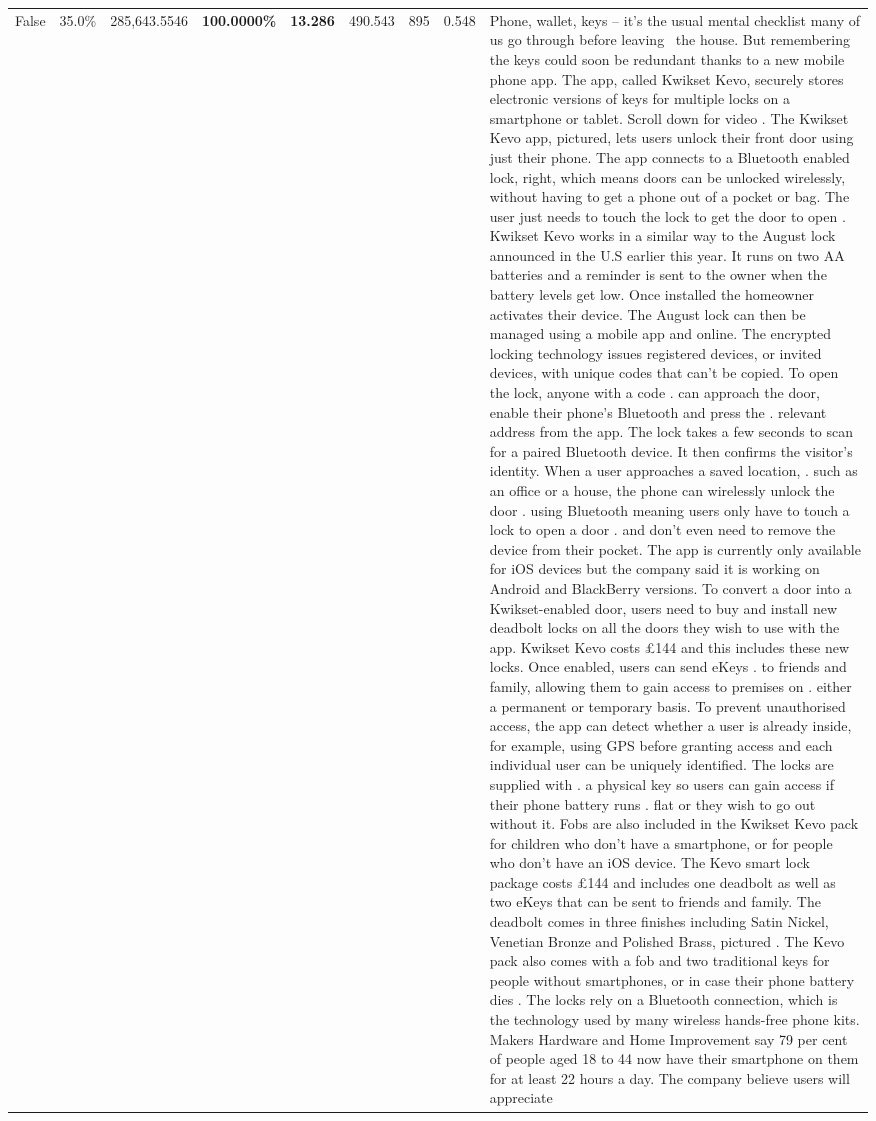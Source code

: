 \begin{table}[H]
\begin{tabular}{lllrlllll}
False & 35.0\% & \color{red} 285,643.5546 & \bfseries \color{red} 100.0000\% & \bfseries \color{red} 13.286 & 490.543 & 895 & 0.548 & Phone, wallet, keys – it’s the usual mental checklist many of us go through before leaving  the house. But remembering the keys could soon be redundant thanks to a new mobile phone app. The app, called Kwikset Kevo, securely stores electronic versions of keys for multiple locks on a smartphone or tablet. Scroll down for video . The Kwikset Kevo app, pictured, lets users unlock their front door using just their phone. The app connects to a Bluetooth enabled lock, right, which means doors can be unlocked wirelessly, without having to get a phone out of a pocket or bag. The user just needs to touch the lock to get the door to open . Kwikset Kevo works in a similar way to the August lock announced in the U.S earlier this year. It runs on two AA batteries and a reminder is sent to the owner when the battery levels get low. Once installed the homeowner activates their device. The August lock can then be managed using a mobile app and online. The encrypted locking technology issues registered devices, or invited devices, with unique codes that can't be copied. To open the lock, anyone with a code . can approach the door, enable their phone's Bluetooth and press the . relevant address from the app. The lock takes a few seconds to scan for a paired Bluetooth device. It then confirms the visitor's identity. When a user approaches a saved location, . such as an office or a house, the phone can wirelessly unlock the door . using Bluetooth meaning users only have to touch a lock to open a door . and don't even need to remove the device from their pocket. The app is currently only available for iOS devices but the company said it is working on Android and BlackBerry versions. To convert a door into a Kwikset-enabled door, users need to buy and install new deadbolt locks on all the doors they wish to use with the app. Kwikset Kevo costs £144 and this includes these new locks. Once enabled, users can send eKeys . to friends and family, allowing them to gain access to premises on . either a permanent or temporary basis. To prevent unauthorised access, the app can detect whether a user is already inside, for example, using GPS before granting access and each individual user can be uniquely identified. The locks are supplied with . a physical key so users can gain access if their phone battery runs . flat or they wish to go out without it. Fobs are also included in the Kwikset Kevo pack for children who don't have a smartphone, or for people who don't have an iOS device. The Kevo smart lock package costs £144 and includes one deadbolt as well as two eKeys that can be sent to friends and family. The deadbolt comes in three finishes including Satin Nickel, Venetian Bronze and Polished Brass, pictured . The Kevo pack also comes with a fob and two traditional keys for people without smartphones, or in case their phone battery dies . The locks rely on a Bluetooth connection, which is the technology used by many wireless hands-free phone kits. Makers Hardware and Home Improvement say 79 per cent of people aged 18 to 44 now have their smartphone on them for at least 22 hours a day. The company believe users will appreciate 
\end{tabular}
\end{table}
